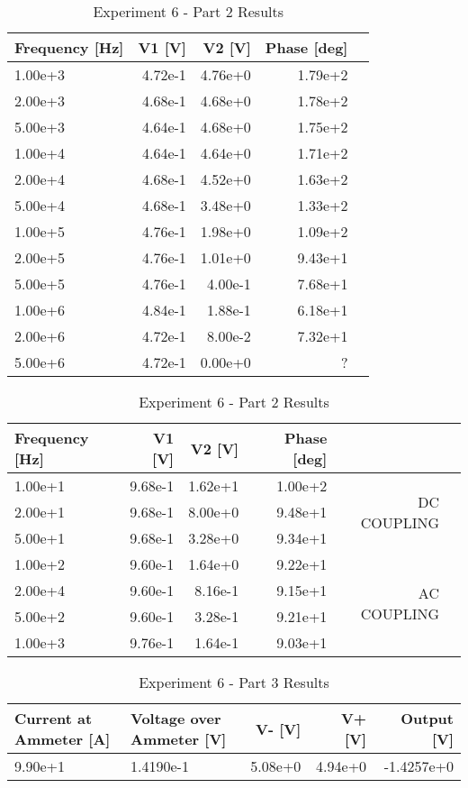 \documentclass[12pt]{report}
\begin{document}
\begin{table}[!htp]\centering
\begin{tabular}{lrrrr}\toprule
Frequency [Hz] &V1 [V] &V2 [V] &Phase [deg] \\\midrule
1.00e+3 &4.72e-1 &4.76e+0 &1.79e+2 \\
2.00e+3 &4.68e-1 &4.68e+0 &1.78e+2 \\
5.00e+3 &4.64e-1 &4.68e+0 &1.75e+2 \\
1.00e+4 &4.64e-1 &4.64e+0 &1.71e+2 \\
2.00e+4 &4.68e-1 &4.52e+0 &1.63e+2 \\
5.00e+4 &4.68e-1 &3.48e+0 &1.33e+2 \\
1.00e+5 &4.76e-1 &1.98e+0 &1.09e+2 \\
2.00e+5 &4.76e-1 &1.01e+0 &9.43e+1 \\
5.00e+5 &4.76e-1 &4.00e-1 &7.68e+1 \\
1.00e+6 &4.84e-1 &1.88e-1 &6.18e+1 \\
2.00e+6 &4.72e-1 &8.00e-2 &7.32e+1 \\
5.00e+6 &4.72e-1 &0.00e+0 &? \\
\bottomrule
\end{tabular}
\caption{Experiment 6 - Part 2 Results}\label{tab: }
\end{table}

\begin{table}[!htp]\centering
\begin{tabular}{lrrrrr}\toprule
Frequency [Hz] &V1 [V] &V2 [V] &Phase [deg] & \\\midrule
1.00e+1 &9.68e-1 &1.62e+1 &1.00e+2 &\multirow{3}{*}{DC COUPLING} \\
2.00e+1 &9.68e-1 &8.00e+0 &9.48e+1 & \\
5.00e+1 &9.68e-1 &3.28e+0 &9.34e+1 & \\
\hline
1.00e+2 &9.60e-1 &1.64e+0 &9.22e+1 &\multirow{4}{*}{AC COUPLING} \\
2.00e+4 &9.60e-1 &8.16e-1 &9.15e+1 & \\
5.00e+2 &9.60e-1 &3.28e-1 &9.21e+1 & \\
1.00e+3 &9.76e-1 &1.64e-1 &9.03e+1 & \\
\bottomrule
\end{tabular}
\caption{Experiment 6 - Part 2 Results}\label{tab: }
\end{table}

\begin{table}[!htp]\centering
\begin{tabular}{p{4cm}p{4cm}rrr} \toprule
Current at Ammeter [A] &Voltage over Ammeter [V] &V- [V] &V+ [V] &Output [V] \\\midrule
9.90e+1 &1.4190e-1 &5.08e+0 &4.94e+0 &-1.4257e+0 \\
\bottomrule
\end{tabular}
\caption{Experiment 6 - Part 3 Results}\label{tab: }
\end{table}
\end{document}
